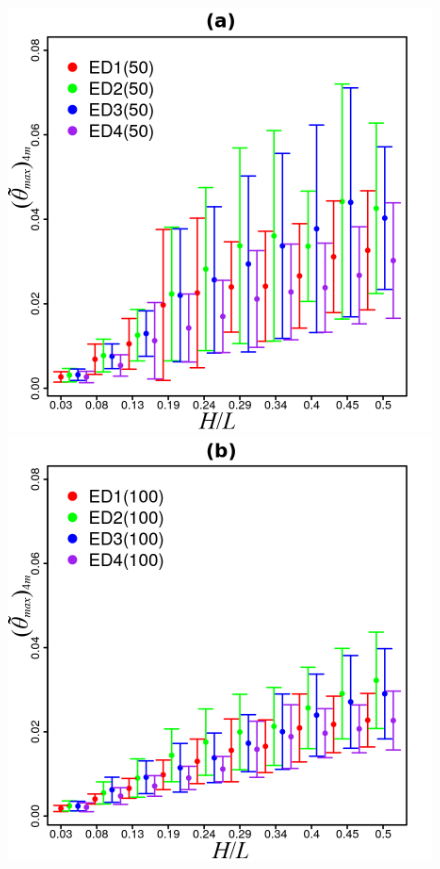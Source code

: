 \documentclass[12pt,A4,A4pt]{article}
\begin{document}
\begin{figure}[!htbp]
\centering
\includegraphics[scale=.98]{imgs/plot_deall50_rdata_std_003-05.png}
\quad
\includegraphics[scale=.98]{imgs/plot_deall100_rdata_std_003-05.png}

\end{figure}
\end{document}
